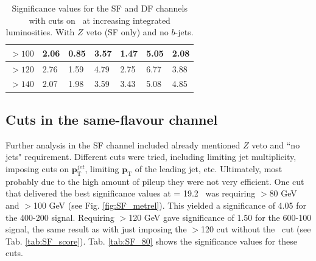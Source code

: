 \begin{table}[H]
\begin{tabular}{|l|llllll}
$>100$   & \multicolumn{1}{l|}{2.06}               & \multicolumn{1}{l|}{0.85}               & \multicolumn{1}{l|}{3.57}               & \multicolumn{1}{l|}{1.47}               & \multicolumn{1}{l|}{5.05}               & \multicolumn{1}{l|}{2.08}               \\ \hline
$>120$    & \multicolumn{1}{l|}{2.76}               & \multicolumn{1}{l|}{1.59}               & \multicolumn{1}{l|}{4.79}               & \multicolumn{1}{l|}{2.75}               & \multicolumn{1}{l|}{6.77}               & \multicolumn{1}{l|}{3.88}               \\ \hline
$>140$    & \multicolumn{1}{l|}{2.07}               & \multicolumn{1}{l|}{1.98}               & \multicolumn{1}{l|}{3.59}               & \multicolumn{1}{l|}{3.43}               & \multicolumn{1}{l|}{5.08}               & \multicolumn{1}{l|}{4.85}               \\ \hline
\end{tabular}
\caption{Significance values for the SF and DF channels with cuts on \mttwo \, at increasing integrated luminosities. With $Z$ veto (SF only) and no $b$-jets. }
\label{tab:SF_score_0bjets}
\end{table}

\subsection{Cuts in the same-flavour channel}
Further analysis in the SF channel included already mentioned $Z$ veto and ``no jets" requirement. Different cuts were tried, including limiting jet multiplicity, imposing cuts on 
$\mathbf{p}^{jet}_{\text{T}}$, limiting $\mathbf{p}_{\text{T}}$ of the leading jet, etc. Ultimately, most probably due to the high amount of pileup they were not very efficient. One cut that delivered the best significance values at \lumi= 19.2 \invfb \, was requiring \metrel$>$80 GeV and \mttwo$>$100 GeV (see Fig. \ref{fig:SF_metrel}). This yielded a significance of 4.05 for the 400-200 signal. Requiring \mttwo$>$120 GeV gave significance of 1.50 for the 600-100 signal, the same result as with just imposing the \mttwo$>$120 cut without the \metrel \, cut (see Tab. \ref{tab:SF_score}). Tab. \ref{tab:SF_80} shows the significance values for these cuts.

